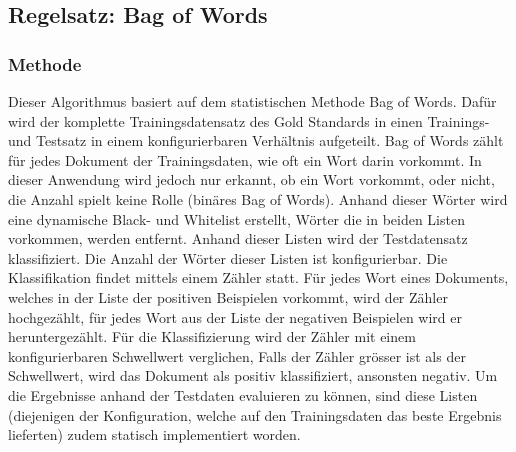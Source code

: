 \subsection{Regelsatz: Bag of Words}
\subsubsection{Methode}
Dieser Algorithmus basiert auf dem statistischen Methode \glqq Bag of Words\grqq{}.
Dafür wird der komplette Trainingsdatensatz des Gold Standards in einen Trainings- und Testsatz in einem konfigurierbaren Verhältnis aufgeteilt.
Bag of Words zählt für jedes Dokument der Trainingsdaten, wie oft ein Wort darin vorkommt.
In dieser Anwendung wird jedoch nur erkannt, ob ein Wort vorkommt, oder nicht, die Anzahl spielt keine Rolle (binäres Bag of Words).
Anhand dieser Wörter wird eine dynamische Black- und Whitelist erstellt, Wörter die in beiden Listen vorkommen, werden entfernt.
Anhand dieser Listen wird der Testdatensatz klassifiziert.
Die Anzahl der Wörter dieser Listen ist konfigurierbar.
Die Klassifikation findet mittels einem Zähler statt.
Für jedes Wort eines Dokuments, welches in der Liste der positiven Beispielen vorkommt, wird der Zähler hochgezählt, für jedes Wort aus der Liste der negativen Beispielen wird er heruntergezählt.
Für die Klassifizierung wird der Zähler mit einem konfigurierbaren Schwellwert verglichen, Falls der Zähler grösser ist als der Schwellwert, wird das Dokument als positiv klassifiziert, ansonsten negativ.
Um die Ergebnisse anhand der Testdaten evaluieren zu können, sind diese Listen (diejenigen der Konfiguration, welche auf den Trainingsdaten das beste Ergebnis lieferten) zudem statisch implementiert worden.
